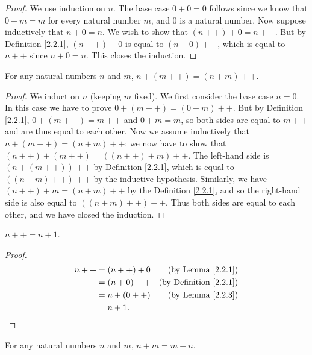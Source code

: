 \begin{proof}
We use induction on \(n\).
The base case \(0 + 0 = 0\) follows since we know that \(0 + m = m\) for every natural number \(m\), and \(0\) is a natural number.
Now suppose inductively that \(n + 0 = n\).
We wish to show that \((n++) + 0 = n++\).
But by Definition \ref{2.2.1}, \((n++) + 0\) is equal to \((n + 0)++\), which is equal to \(n++\) since \(n + 0 = n\).
This closes the induction.
\end{proof}

\begin{lemma}\label{2.2.3}
For any natural numbers \(n\) and \(m\), \(n + (m++) = (n + m)++\).
\end{lemma}

\begin{proof}
We induct on \(n\) (keeping \(m\) fixed).
We first consider the base case \(n = 0\).
In this case we have to prove \(0 + (m++) = (0 + m)++\).
But by Definition \ref{2.2.1}, \(0 + (m++) = m++\) and \(0 + m = m\), so both sides are equal to \(m++\) and are thus equal to each other.
Now we assume inductively that \(n + (m++) = (n + m)++\);
we now have to show that \((n++) + (m++) = ((n++) + m)++\).
The left-hand side is \((n + (m++))++\) by Definition \ref{2.2.1}, which is equal to \(((n+m)++)++\) by the inductive hypothesis.
Similarly, we have \((n++) + m = (n + m)++\) by the Definition \ref{2.2.1}, and so the right-hand side is also equal to \(((n + m)++)++\).
Thus both sides are equal to each other, and we have closed the induction.
\end{proof}

\begin{additional corollary}\label{ac 2.2.2}
\(n++ = n + 1\).
\end{additional corollary}

\begin{proof}
\begin{align*}
n++ &= (n++) + 0 & \text{(by Lemma \ref{2.2.1})} \\
&= (n + 0)++ & \text{(by Definition \ref{2.2.1})} \\
&= n + (0++) & \text{(by Lemma \ref{2.2.3})} \\
&= n + 1.
\end{align*}
\end{proof}

\begin{proposition}\label{2.2.4}
For any natural numbers \(n\) and \(m\), \(n + m = m + n\).
\end{proposition}


